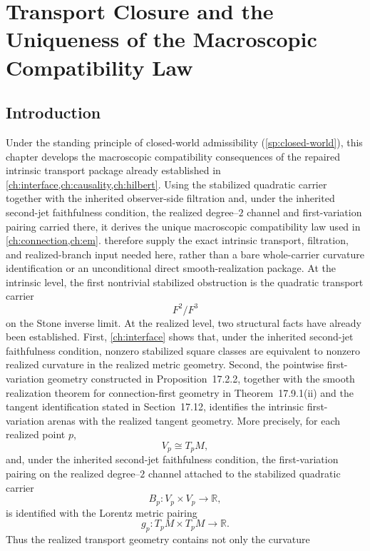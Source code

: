 \chapter{Transport Closure and the Uniqueness of the Macroscopic Compatibility Law}
\label{ch:einstein}
\section{Introduction}
Under the standing principle of closed-world admissibility
(\cref{sp:closed-world}), this chapter develops the macroscopic
compatibility consequences of the repaired intrinsic transport package
already established in \cref{ch:interface,ch:causality,ch:hilbert}.
Using the stabilized quadratic carrier together with the inherited
observer-side filtration and, under the inherited second-jet
faithfulness condition, the realized degree--\(2\) channel and
first-variation pairing carried there, it derives the unique
macroscopic compatibility law used in \cref{ch:connection,ch:em}.
 therefore supply the
exact intrinsic transport, filtration, and realized-branch input
needed here, rather than a bare whole-carrier curvature
identification or an unconditional direct smooth-realization
package.
At the intrinsic level, the first nontrivial stabilized obstruction is
the quadratic transport carrier
\[
	F^2/F^3
\]
on the Stone inverse limit.
At the realized level, two structural facts have already been established.
First, \cref{ch:interface} shows that, under the inherited
second-jet faithfulness condition, nonzero stabilized square classes
are equivalent to nonzero realized curvature in the realized metric
geometry.
Second, the pointwise first-variation geometry constructed in
Proposition~17.2.2, together with the smooth realization theorem for
connection-first geometry in Theorem~17.9.1(ii) and the tangent
identification stated in Section~17.12, identifies the intrinsic
first-variation arenas with the realized tangent geometry.  More
precisely, for each realized point \(p\),
\[
	V_p \cong T_pM,
\]
and, under the inherited second-jet faithfulness condition, the
first-variation pairing on the realized degree--\(2\) channel
attached to the stabilized quadratic carrier
\[
	B_p:V_p\times V_p\to\mathbb R,
\]
is identified with the Lorentz metric pairing
\[
	g_p:T_pM\times T_pM\to\mathbb R.
\]
Thus the realized transport geometry contains not only the curvature
